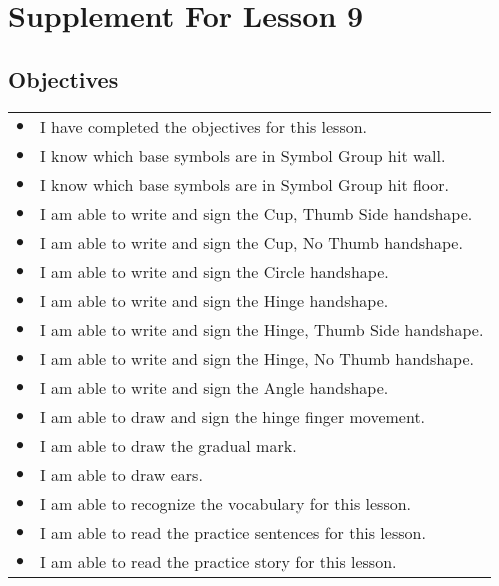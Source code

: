 \documentclass{article}
\begin{document}
\newfontfamily{}
\newfontfamily{}
\newcommand{\bul}{\hfil$\bullet$&}
\renewenvironment{glossary}{\begin{multicols}{5}\begin{center}}{\end{center}\end{multicols}}
\setcounter{secnumdepth}{0}
\setlength{\columnseprule}{1pt}

\section{Supplement For Lesson 9}

\subsection{Objectives}

\begin{tabular}{p{1cm}p{14cm}}
\bul I have completed the objectives for this lesson.\\
\bul I know which base symbols are in Symbol Group hit wall.\\
\bul I know which base symbols are in Symbol Group hit floor.\\
\bul I am able to write and sign the Cup, Thumb Side handshape.\\
\bul I am able to write and sign the Cup, No Thumb handshape.\\
\bul I am able to write and sign the Circle handshape.\\
\bul I am able to write and sign the Hinge handshape.\\
\bul I am able to write and sign the Hinge, Thumb Side handshape.\\
\bul I am able to write and sign the Hinge, No Thumb handshape.\\
\bul I am able to write and sign the Angle handshape.\\
\bul I am able to draw and sign the hinge finger movement.\\
\bul I am able to draw the gradual mark.\\
\bul I am able to draw ears.\\
\bul I am able to recognize the vocabulary for this lesson.\\
\bul I am able to read the practice sentences for this lesson.\\
\bul I am able to read the practice story for this lesson.\\
\end{tabular}
\end{document}
